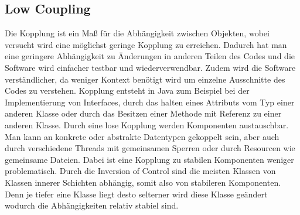\subsection{Low Coupling}
Die Kopplung ist ein Maß für die Abhängigkeit zwischen Objekten, wobei versucht wird eine möglichst geringe Kopplung zu erreichen.
Dadurch hat man eine geringere Abhängigkeit zu Änderungen in anderen Teilen des Codes und die Software wird einfacher testbar und wiederverwendbar.
Zudem wird die Software verständlicher, da weniger Kontext benötigt wird um einzelne Ausschnitte des Codes zu verstehen.
Kopplung entsteht in Java zum Beispiel bei der Implementierung von Interfaces,
durch das halten eines Attributs vom Typ einer anderen Klasse oder durch das Besitzen einer Methode mit Referenz zu einer anderen Klasse.
Durch eine lose Kopplung werden Komponenten austauschbar.
Man kann an konkrete oder abstrakte Datentypen gekoppelt sein, aber auch durch verschiedene Threads mit gemeinsamen Sperren oder durch Resourcen wie gemeinsame Dateien.
Dabei ist eine Kopplung zu stabilen Komponenten weniger problematisch.
Durch die Inversion of Control sind die meisten Klassen von Klassen innerer Schichten abhängig, somit also von stabileren Komponenten.
Denn je tiefer eine Klasse liegt desto selterner wird diese Klasse geändert wodurch die Abhängigkeiten relativ stabiel sind.

